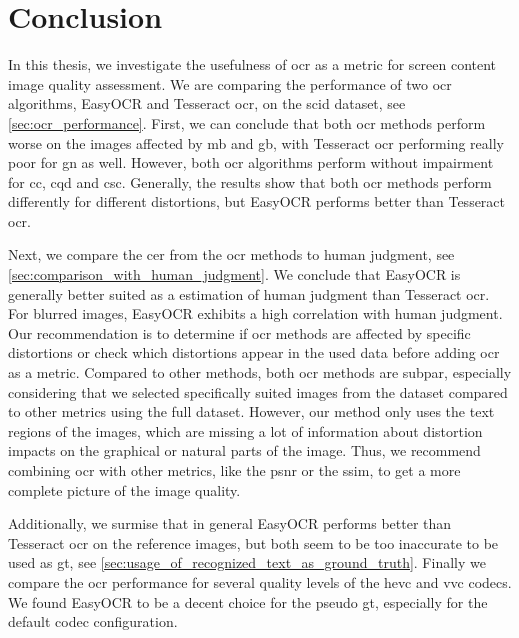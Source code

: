 \chapter{Conclusion}
\label{chap:conclusion}

In this thesis, we investigate the usefulness of \gls{ocr} as a metric for screen content image quality assessment.
We are comparing the performance of two \gls{ocr} algorithms, EasyOCR and Tesseract \gls{ocr}, on the \gls{scid} dataset, see \autoref{sec:ocr_performance}.
First, we can conclude that both \gls{ocr} methods perform worse on the images affected by \gls{mb} and \gls{gb}, with Tesseract \gls{ocr} performing really poor for \gls{gn} as well.
However, both \gls{ocr} algorithms perform without impairment for \gls{cc}, \gls{cqd} and \gls{csc}.
Generally, the results show that both \gls{ocr} methods perform differently for different distortions, but EasyOCR performs better than Tesseract \gls{ocr}.


Next, we compare the \gls{cer} from the \gls{ocr} methods to human judgment, see \autoref{sec:comparison_with_human_judgment}.
We conclude that EasyOCR is generally better suited as a estimation of human judgment than Tesseract \gls{ocr}.
For blurred images, EasyOCR exhibits a high correlation with human judgment.
Our recommendation is to determine if \gls{ocr} methods are affected by specific distortions or check which distortions appear in the used data before adding \gls{ocr} as a metric.
Compared to other methods, both \gls{ocr} methods are subpar, especially considering that we selected specifically suited images from the dataset compared to other metrics using the full dataset.
However, our method only uses the text regions of the images, which are missing a lot of information about distortion impacts on the graphical or natural parts of the image.
Thus, we recommend combining \gls{ocr} with other metrics, like the \gls{psnr} or the \gls{ssim}, to get a more complete picture of the image quality.

Additionally, we surmise that in general EasyOCR performs better than Tesseract \gls{ocr} on the reference images, but both seem to be too inaccurate to be used as \gls{gt}, see \autoref{sec:usage_of_recognized_text_as_ground_truth}.
Finally we compare the \gls{ocr} performance for several quality levels of the \gls{hevc} and \gls{vvc} codecs.
We found EasyOCR to be a decent choice for the pseudo \gls{gt}, especially for the default codec configuration.


